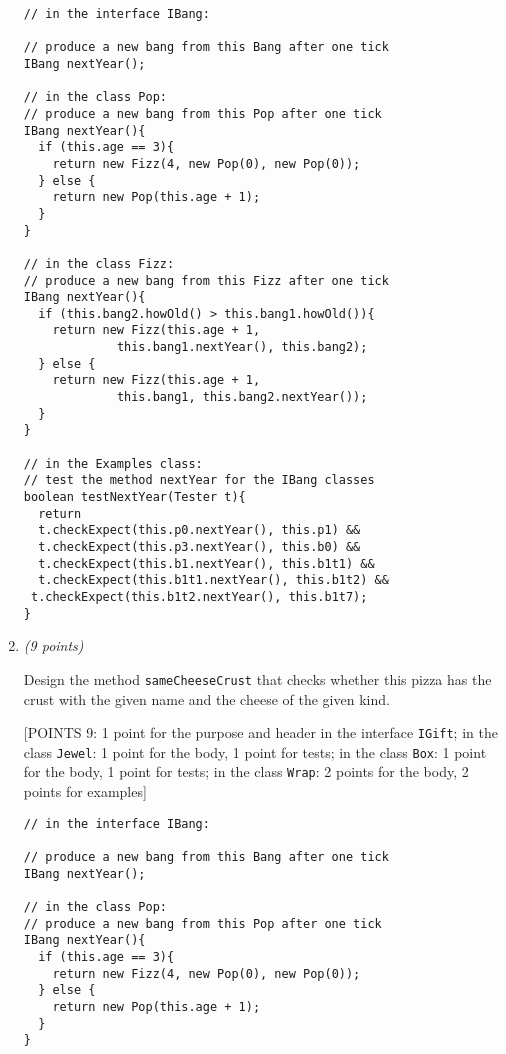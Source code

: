 \documentclass[11pt]{article}
\newcommand\code[1]{\texttt{#1}}
\newcounter{Pctr}
\newenvironment{problem}{\stepcounter{Pctr}%
\begin{description}
\item[\noindent{\bf Problem} \arabic{Pctr}] 
\end{description}}{\relax}
\begin{document}
\begin{problem}
\begin{enumerate}
\begin{verbatim}
// in the interface IBang:

// produce a new bang from this Bang after one tick
IBang nextYear();

// in the class Pop:
// produce a new bang from this Pop after one tick
IBang nextYear(){
  if (this.age == 3){
    return new Fizz(4, new Pop(0), new Pop(0));
  } else {
    return new Pop(this.age + 1);
  }
}

// in the class Fizz:
// produce a new bang from this Fizz after one tick
IBang nextYear(){
  if (this.bang2.howOld() > this.bang1.howOld()){
    return new Fizz(this.age + 1, 
             this.bang1.nextYear(), this.bang2);
  } else {
    return new Fizz(this.age + 1, 
             this.bang1, this.bang2.nextYear());
  }
}

// in the Examples class:
// test the method nextYear for the IBang classes
boolean testNextYear(Tester t){
  return
  t.checkExpect(this.p0.nextYear(), this.p1) &&
  t.checkExpect(this.p3.nextYear(), this.b0) &&
  t.checkExpect(this.b1.nextYear(), this.b1t1) &&
  t.checkExpect(this.b1t1.nextYear(), this.b1t2) &&
 t.checkExpect(this.b1t2.nextYear(), this.b1t7);
}
\end{verbatim}
\endsol

\newpage
\item {\em{(9 points)}}

Design the method \code{sameCheeseCrust} that checks whether this pizza
has the crust with the given name and the cheese of the given kind.


\begsol{\vspace{0.5in}}
[POINTS 9: 1 point for the purpose and header in the interface
\texttt{IGift}; in the class \texttt{Jewel}: 1 point for the body, 1
point for tests; in the class \texttt{Box}: 1 point for the body, 1
point for tests; in the class \texttt{Wrap}: 2 
points for the body, 2 points for examples]

\begin{verbatim}
// in the interface IBang:

// produce a new bang from this Bang after one tick
IBang nextYear();

// in the class Pop:
// produce a new bang from this Pop after one tick
IBang nextYear(){
  if (this.age == 3){
    return new Fizz(4, new Pop(0), new Pop(0));
  } else {
    return new Pop(this.age + 1);
  }
}


\end{verbatim}
\end{enumerate}
\end{problem}
\end{document}
